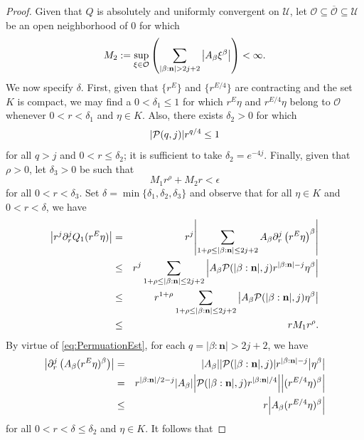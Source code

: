 \documentclass[11pt, letter]{book}
\newcommand{\lp}{\left(}
\newcommand{\rp}{\right)}
\begin{document}
\begin{proof}
Given that $Q$ is absolutely and uniformly convergent on $\mathcal{U}$, let $\mathcal{O}\subseteq \overline{\mathcal{O}}\subseteq\mathcal{U}$ be an open neighborhood of $0$ for which
\begin{equation*}
    M_2:=\sup_{\xi\in \mathcal{O}}\lp \sum_{|\beta:\mathbf{n}|>2j+2}\abs{A_\beta\xi^\beta}\rp<\infty.
\end{equation*}
We now specify $\delta$. First, given that $\{r^E\}$ and $\{r^{E/4}\}$ are contracting and the set $K$ is compact, we may find a $0<\delta_1\leq 1$ for which $r^E\eta$ and $r^{E/4}\eta$ belong to $\mathcal{O}$ whenever $0<r<\delta_1$ and $\eta\in K$. Also, there exists $\delta_2>0$ for which
\begin{equation}\label{eq:PermuationEst}
    \abs{\mathcal{P}(q,j)}r^{q/4}\leq 1
\end{equation}
for all $q>j$ and $0<r\leq \delta_2$; it is sufficient to take $\delta_2=e^{-4j}$.  Finally, given that $\rho>0$, let $\delta_3>0$ be such that
\begin{equation*}
    M_1 r^\rho+M_2r<\epsilon
\end{equation*}
for all $0<r<\delta_3$. Set $\delta=\min\{\delta_1,\delta_2,\delta_3\}$ and observe that
for all $\eta\in K$ and $0<r<\delta$, we have
\begin{eqnarray*}
    \abs{r^j\partial_r^jQ_1(r^E\eta)}&=&r^j\abs{\sum_{1+\rho\leq|\beta:\mathbf{n}|\leq 2j+2}A_\beta \partial_r^j\lp r^E\eta\rp^{\beta}}\\
    &\leq&r^j\sum_{1+\rho\leq|\beta:\mathbf{n}|\leq 2j+2}\abs{A_\beta\mathcal{P}(|\beta:\mathbf{n}|,j)r^{|\beta:\mathbf{n}|-j}\eta^\beta}\\
    &\leq&r^{1+\rho}\sum_{1+\rho\leq |\beta:\mathbf{n}|\leq 2j+2}\abs{A_\beta \mathcal{P}(|\beta:\mathbf{n}|,j)\eta^\beta}\\
&\leq&r  M_1r^\rho.
\end{eqnarray*}
By virtue of \eqref{eq:PermuationEst}, for each $q=|\beta:\mathbf{n}|>2j+2$, we have
\begin{eqnarray*}
    \abs{\partial_r^j\lp A_\beta(r^E\eta)^\beta\rp}&=&\abs{A_\beta}\abs{\mathcal{P}(|\beta:\mathbf{n}|,j)}r^{|\beta:\mathbf{n}|-j}\abs{\eta^\beta}\\
    &=&r^{|\beta:\mathbf{n}|/2-j}\abs{A_\beta}\abs{\mathcal{P}(|\beta:\mathbf{n}|,j)r^{|\beta:\mathbf{n}|/4}}\abs{(r^{E/4}\eta)^\beta}\\
    &\leq& r\abs{A_\beta(r^{E/4}\eta)^\beta}
\end{eqnarray*}
for all $0<r<\delta\leq\delta_2$ and $\eta\in K$. It follows that

\end{proof}
\end{document}
